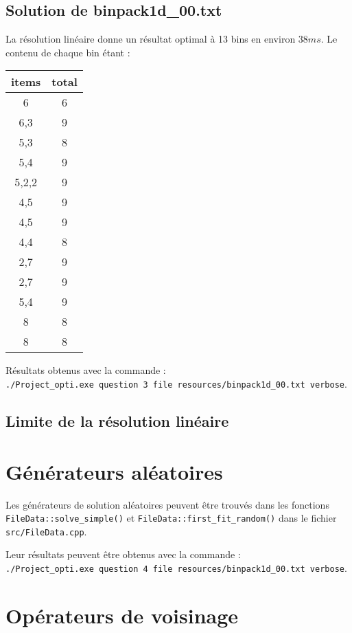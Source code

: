 \documentclass[10pt,a4paper]{article}
\begin{document}
\subsection{Solution de binpack1d\_00.txt}

La résolution linéaire donne un résultat optimal à 13 bins en environ $38ms$.
Le contenu de chaque bin étant :

\begin{center}
  \begin{tabular}{ | c | c | }  \hline
    items & total \\ \hline
    6     & 6     \\ \hline
    6,3   & 9     \\ \hline
    5,3   & 8     \\ \hline
    5,4   & 9     \\ \hline
    5,2,2 & 9     \\ \hline
    4,5   & 9     \\ \hline
    4,5   & 9     \\ \hline
    4,4   & 8     \\ \hline
    2,7   & 9     \\ \hline
    2,7   & 9     \\ \hline
    5,4   & 9     \\ \hline
    8     & 8     \\ \hline
    8     & 8     \\ \hline
   \end{tabular}
\end{center}

Résultats obtenus avec la commande : \\ \texttt{./Project\_opti.exe question 3 file resources/binpack1d\_00.txt verbose}.

\subsection{Limite de la résolution linéaire}

\section{Générateurs aléatoires}

Les générateurs de solution aléatoires peuvent être trouvés dans les fonctions \texttt{FileData::solve\_simple()} et \texttt{FileData::first\_fit\_random()} dans le fichier \texttt{src/FileData.cpp}. 

Leur résultats peuvent être obtenus avec la commande : \\ \texttt{./Project\_opti.exe question 4 file resources/binpack1d\_00.txt verbose}.

\section{Opérateurs de voisinage}




\fi
\end{document}
